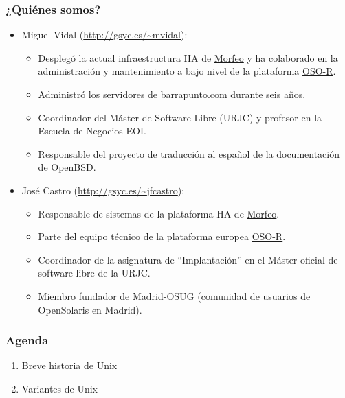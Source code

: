 \documentclass{beamer}
\begin{document}
\begin{frame}
\frametitle{¿Quiénes somos?}

\begin{itemize}
\item \alert{Miguel Vidal} (\url{http://gsyc.es/~mvidal}): 


	\begin{itemize}

\footnotesize

	\item Desplegó la actual infraestructura HA de \href{http://www.morfeo-project.org}{Morfeo} y ha colaborado en la administración y mantenimiento a bajo nivel de la plataforma \href{http://www.osor.eu}{OSO-R}. 
	\item Administró los servidores de barrapunto.com durante seis años.
	\item Coordinador del Máster de Software Libre (URJC) y profesor en la Escuela de Negocios EOI.
	\item Responsable del proyecto de traducción al español de la \href{http://www.openbsd.org/translation.html\#WHO}{documentación de OpenBSD}.
	\end{itemize}

\normalsize

\item \alert{José Castro} (\url{http://gsyc.es/~jfcastro}): 

	\begin{itemize}

\footnotesize

	\item Responsable de sistemas de la plataforma HA de \href{http://www.morfeo-project.org}{Morfeo}. 
	\item Parte del equipo técnico de la plataforma europea \href{http://www.osor.eu}{OSO-R}.
	\item Coordinador de la asignatura de ``Implantación'' en el Máster oficial de software libre de la URJC.
	\item Miembro fundador de Madrid-OSUG (comunidad de usuarios de OpenSolaris en Madrid).
	\end{itemize}

\end{itemize}
\end{frame}

\normalsize

\begin{frame}
  \frametitle{Agenda}

\begin{enumerate}
\item Breve historia de Unix
\item Variantes de Unix
\end{enumerate}

\end{frame}
\end{document}
